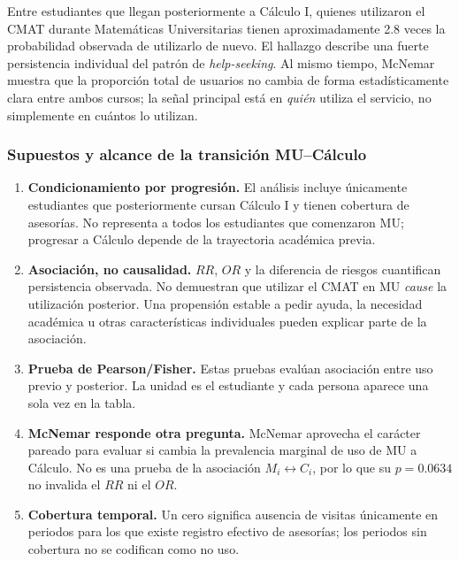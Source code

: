 \begin{answerbox}
Entre estudiantes que llegan posteriormente a Cálculo I, quienes utilizaron el CMAT durante Matemáticas Universitarias tienen aproximadamente 2.8 veces la probabilidad observada de utilizarlo de nuevo. El hallazgo describe una fuerte persistencia individual del patrón de \emph{help-seeking}. Al mismo tiempo, McNemar muestra que la proporción total de usuarios no cambia de forma estadísticamente clara entre ambos cursos; la señal principal está en \emph{quién} utiliza el servicio, no simplemente en cuántos lo utilizan.
\end{answerbox}

\subsubsection{Supuestos y alcance de la transición MU--Cálculo}

\begin{enumerate}[label=\arabic*.]
\item \textbf{Condicionamiento por progresión.} El análisis incluye únicamente estudiantes que posteriormente cursan Cálculo I y tienen cobertura de asesorías. No representa a todos los estudiantes que comenzaron MU; progresar a Cálculo depende de la trayectoria académica previa.
\item \textbf{Asociación, no causalidad.} $RR$, $OR$ y la diferencia de riesgos cuantifican persistencia observada. No demuestran que utilizar el CMAT en MU \emph{cause} la utilización posterior. Una propensión estable a pedir ayuda, la necesidad académica u otras características individuales pueden explicar parte de la asociación.
\item \textbf{Prueba de Pearson/Fisher.} Estas pruebas evalúan asociación entre uso previo y posterior. La unidad es el estudiante y cada persona aparece una sola vez en la tabla.
\item \textbf{McNemar responde otra pregunta.} McNemar aprovecha el carácter pareado para evaluar si cambia la prevalencia marginal de uso de MU a Cálculo. No es una prueba de la asociación $M_i\leftrightarrow C_i$, por lo que su $p=0.0634$ no invalida el $RR$ ni el $OR$.
\item \textbf{Cobertura temporal.} Un cero significa ausencia de visitas únicamente en periodos para los que existe registro efectivo de asesorías; los periodos sin cobertura no se codifican como no uso.
\end{enumerate}

